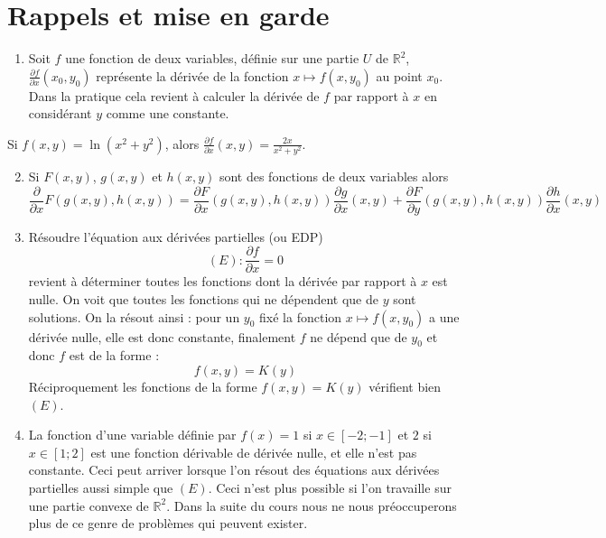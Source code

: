 \documentclass[12pt]{article}
\newcounter{exemple}
\begin{document}
\section{Rappels et mise en garde}

\begin{enumerate}
  \item Soit $f$ une fonction de deux variables, définie sur une partie $U$ de $\mathbb{R}^{2}$, $\frac{\partial f}{\partial x}\left(x_{0}, y_{0}\right)$ représente la dérivée de la fonction $x \longmapsto f\left(x, y_{0}\right)$ au point $x_{0}$. Dans la pratique cela revient à calculer la dérivée de $f$ par rapport à $x$ en considérant $y$ comme une constante.
\end{enumerate}

\begin{exemple}
Si $f(x, y)=\ln \left(x^{2}+y^{2}\right)$, alors $\frac{\partial f}{\partial x}(x, y)=\frac{2 x}{x^{2}+y^{2}}$.
\end{exemple}

\begin{enumerate}
  \setcounter{enumi}{1}
  \item Si $F(x, y)$, $g(x, y)$ et $h(x, y)$ sont des fonctions de deux variables alors
$$
\frac{\partial}{\partial x} F(g(x, y), h(x, y)) = \frac{\partial F}{\partial x}(g(x, y), h(x, y)) \frac{\partial g}{\partial x}(x, y) + \frac{\partial F}{\partial y}(g(x, y), h(x, y)) \frac{\partial h}{\partial x}(x, y)
$$

  \item Résoudre l'équation aux dérivées partielles (ou EDP)
$$
(E): \frac{\partial f}{\partial x} = 0
$$
revient à déterminer toutes les fonctions dont la dérivée par rapport à $x$ est nulle. On voit que toutes les fonctions qui ne dépendent que de $y$ sont solutions. On la résout ainsi : pour un $y_{0}$ fixé la fonction $x \longmapsto f\left(x, y_{0}\right)$ a une dérivée nulle, elle est donc constante, finalement $f$ ne dépend que de $y_{0}$ et donc $f$ est de la forme :
$$
f(x, y) = K(y)
$$
Réciproquement les fonctions de la forme $f(x, y)=K(y)$ vérifient bien $(E)$.

  \item La fonction d'une variable définie par $f(x)=1$ si $x \in[-2 ;-1]$ et $2$ si $x \in[1 ; 2]$ est une fonction dérivable de dérivée nulle, et elle n'est pas constante. Ceci peut arriver lorsque l'on résout des équations aux dérivées partielles aussi simple que $(E)$. Ceci n'est plus possible si l'on travaille sur une partie convexe de $\mathbb{R}^{2}$. Dans la suite du cours nous ne nous préoccuperons plus de ce genre de problèmes qui peuvent exister.
\end{enumerate}
\end{document}
